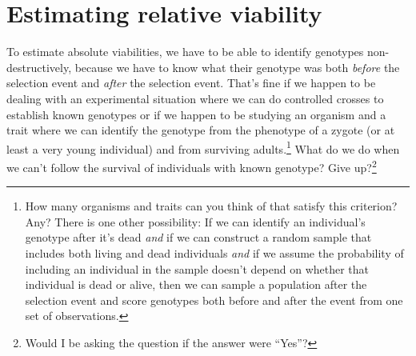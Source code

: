 \documentclass[12pt]{article}
\begin{document}
\section*{Estimating relative viability}

To estimate absolute viabilities, we have to be able to identify
genotypes non-destructively, because we have to know what their
genotype was both {\it before\/} the selection event and {\it after\/}
the selection event. That's fine if we happen to be dealing with an
experimental situation where we can do controlled crosses to establish
known genotypes or if we happen to be studying an organism and a trait
where we can identify the genotype from the phenotype of a zygote (or
at least a very young individual) and from surviving
adults.\footnote{How many organisms and traits can you think of that
  satisfy this criterion? Any? There is one other possibility: If we
  can identify an individual's genotype after it's dead {\it and\/} if
  we can construct a random sample that includes both living and dead
  individuals {\it and\/} if we assume the probability of including an
  individual in the sample doesn't depend on whether that individual
  is dead or alive, then we can sample a population after the
  selection event and score genotypes both before and after the event
  from one set of observations.} What do we do when we can't follow
the survival of individuals with known genotype? Give
up?\footnote{Would I be asking the question if the answer were
  ``Yes''?}
\end{document}
